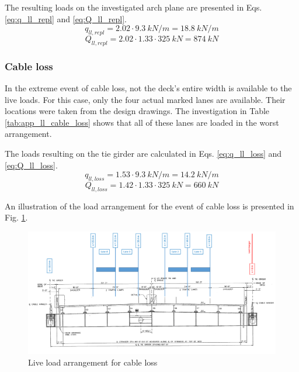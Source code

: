 The resulting loads on the investigated arch plane are presented in Eqs. \eqref{eq:q_ll_repl} and \eqref{eq:Q_ll_repl}.
\begin{equation}
    q_{ll, repl} = 2.02 \cdot \SI{9.3}{kN/m} = \SI{18.8}{kN/m}
    \label{eq:q_ll_repl}
\end{equation}
\begin{equation}
    Q_{ll, repl} = 2.02 \cdot 1.33 \cdot \SI{325}{kN} = \SI{874}{kN}
    \label{eq:Q_ll_repl}
\end{equation}

\subsubsection*{Cable loss} \label{Appendx_A_Live_loading_3}
In the extreme event of cable loss, not the deck's entire width is available to the live loads. For this case, only the four actual marked lanes are available. Their locations were taken from the design drawings. The investigation in Table \ref{tab:app_ll_cable_loss} shows that all of these lanes are loaded in the worst arrangement.


The loads resulting on the tie girder are calculated in Eqs. \eqref{eq:q_ll_loss} and \eqref{eq:Q_ll_loss}.
\begin{equation}
    q_{ll, loss} = 1.53 \cdot \SI{9.3}{kN/m} = \SI{14.2}{kN/m}
    \label{eq:q_ll_loss}
\end{equation}
\begin{equation}
    Q_{ll, loss} = 1.42 \cdot 1.33 \cdot \SI{325}{kN} = \SI{660}{kN}
    \label{eq:Q_ll_loss}
\end{equation}

An illustration of the load arrangement for the event of cable loss is presented in Fig. \ref{fig:app_hangers_cable_loss}.

\begin{figure}[H]
    \centering
    \includegraphics[width=\textwidth]{overleaf/Appendix/Pictures/Cross_Section_LL_Cable Loss.PNG}
    \caption{Live load arrangement for cable loss}
    \label{fig:app_hangers_cable_loss}
\end{figure}

